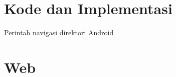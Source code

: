 \section{Kode dan Implementasi}
Perintah navigasi direktori Android























\section{Web}
